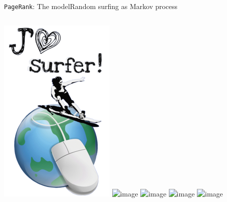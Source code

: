 \documentclass[xcolor=table,final]{beamer} %
\newcommand{\PageRank}{\texttt{PageRank}\xspace}
\begin{document}
\begin{frame}{\PageRank : The model}{Random surfing as Markov process}

  \begin{columns}
    \includegraphics[width=1.\textwidth]{figs/extras/web-surfer}
      \includegraphics<1>[width=1.\textwidth]{figs/tex/graph}
      \includegraphics<2>[width=1.\textwidth]{figs/tex/graph_probability0}
      \includegraphics<3>[width=1.\textwidth]{figs/tex/graph_probability1}
      \includegraphics<4>[width=1.\textwidth]{figs/tex/graph_probability2}
    

\end{columns}
\end{frame}
\end{document}

